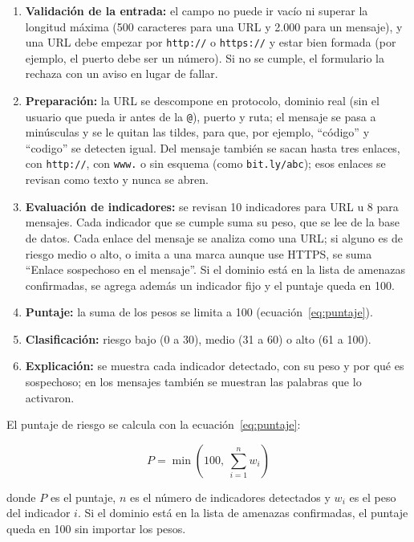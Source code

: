\documentclass[journal,onecolumn,12pt,draftclsnofoot]{IEEEtran}
\begin{document}
\begin{enumerate}
  \item \textbf{Validación de la entrada:} el campo no puede ir vacío ni superar la longitud máxima (500 caracteres para una URL y 2.000 para un mensaje), y una URL debe empezar por \texttt{http://} o \texttt{https://} y estar bien formada (por ejemplo, el puerto debe ser un número). Si no se cumple, el formulario la rechaza con un aviso en lugar de fallar.
  \item \textbf{Preparación:} la URL se descompone en protocolo, dominio real (sin el usuario que pueda ir antes de la \texttt{@}), puerto y ruta; el mensaje se pasa a minúsculas y se le quitan las tildes, para que, por ejemplo, ``código'' y ``codigo'' se detecten igual. Del mensaje también se sacan hasta tres enlaces, con \texttt{http://}, con \texttt{www.} o sin esquema (como \texttt{bit.ly/abc}); esos enlaces se revisan como texto y nunca se abren.
  \item \textbf{Evaluación de indicadores:} se revisan 10 indicadores para URL u 8 para mensajes. Cada indicador que se cumple suma su peso, que se lee de la base de datos. Cada enlace del mensaje se analiza como una URL; si alguno es de riesgo medio o alto, o imita a una marca aunque use HTTPS, se suma ``Enlace sospechoso en el mensaje''. Si el dominio está en la lista de amenazas confirmadas, se agrega además un indicador fijo y el puntaje queda en 100.
  \item \textbf{Puntaje:} la suma de los pesos se limita a 100 (ecuación~\eqref{eq:puntaje}).
  \item \textbf{Clasificación:} riesgo bajo (0 a 30), medio (31 a 60) o alto (61 a 100).
  \item \textbf{Explicación:} se muestra cada indicador detectado, con su peso y por qué es sospechoso; en los mensajes también se muestran las palabras que lo activaron.
\end{enumerate}

El puntaje de riesgo se calcula con la ecuación~\eqref{eq:puntaje}:

\begin{equation}\label{eq:puntaje}
P = \min\left(100,\ \sum_{i=1}^{n} w_i\right)
\end{equation}

donde $P$ es el puntaje, $n$ es el número de indicadores detectados y $w_i$ es el peso del indicador $i$. Si el dominio está en la lista de amenazas confirmadas, el puntaje queda en 100 sin importar los pesos.
\end{document}
